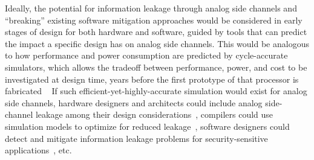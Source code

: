 \documentclass[11 pt]{article}
\begin{document}
Ideally, the potential for information leakage through analog side channels and ``breaking'' existing software mitigation approaches would be considered in early stages of design for both hardware and software, guided by tools that can predict the impact a specific design has on analog side channels. This would be analogous to how performance and power consumption are predicted by cycle-accurate simulators, which allows the tradeoff between performance, power, and cost to be investigated at design time, years before the first prototype of that processor is fabricated ~\cite{Li:2009:MIP:1669112.1669172,Li:2011:CAM:2132325.2132479,509850,Ardestani:2013:EFM:2495252.2495480,Binkert:2011:GS:2024716.2024718,sesc,5982026,carlson2014aeohmcm} If such efficient-yet-highly-accurate simulation would exist for analog side channels, hardware designers and architects could include analog side-channel leakage among their design considerations~\cite{8416860,Althoff:2018:HII:3276539.3276601,Andrysco:2018:TVC:3243734.3243766,cryptoeprint:2018:808,Rane:2016:SPF:3241094.3241101,nayak2017hop}, compilers could use simulation models to optimize for reduced leakage~\cite{Liu:2015:GHS:2694344.2694385,Rane:2015:RCD:2831143.2831171,Gorman:2017:AON:3123939.3123973}, software designers could detect and mitigate information leakage problems for security-sensitive applications~\cite{Wichelmann:2018:MFF:3274694.3274741,Chen:2017:PDS:3133956.3134058,Wu:2018:ETS:3213846.3213851}, etc.
\end{document}
